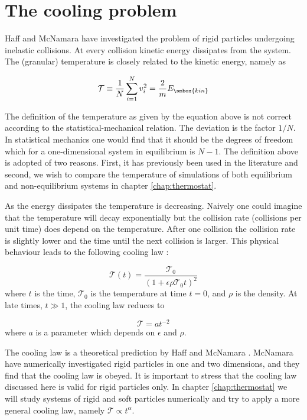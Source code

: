 \section{The cooling problem}
\label{sect:CoolProblem}
Haff \cite{Haff83} and McNamara \etal \cite{McNamara93a} have
investigated the problem of rigid particles undergoing inelastic
collisions. At every collision kinetic energy dissipates from the
system. The (granular) temperature is closely related to the kinetic
energy, namely as

\begin{equation}
  \mathcal{T} \equiv \frac{1}{N} \sum_{i=1}^N v_i^2 = \frac{2}{m} E_{\smbox{kin}}
\end{equation}

The definition of the temperature as given by the equation above is
not correct according to the statistical-mechanical relation. The
deviation is the factor $1/N$. In statistical mechanics one would find
that it should be the degrees of freedom which for a one-dimensional
system in equilibrium is $N-1$. The definition above is adopted of two
reasons. First, it has previously been used in the literature and
second, we wish to compare the temperature of simulations of both
equilibrium and non-equilibrium systems in chapter
\ref{chap:thermostat}.

As the energy dissipates the temperature is decreasing. Naively
one could imagine that the temperature will decay exponentially but
the collision rate (collisions per unit time) does depend on the
temperature. After one collision the collision rate is slightly lower
and the time until the next collision is larger. This physical
behaviour leads to the following cooling law \cite{McNamara93a}:

\begin{equation}
  \mathcal{T}(t) = \frac{\mathcal{T}_0}{(1+\epsilon\rho \mathcal{T}_0 t)^2}
\end{equation}
where $t$ is the time, $\mathcal{T}_0$ is the temperature at time $t=0$, and
$\rho$ is the density. At late times, $t\gg 1$, the cooling law
reduces to

\begin{equation}
  \mathcal{T} = a t^{-2}
\end{equation}
where $a$ is a parameter which depends on $\epsilon$ and $\rho$.

The cooling law is a theoretical prediction by Haff \cite{Haff83} and
McNamara \etal \cite{McNamara93a}. McNamara \etal \cite{McNamara93a,
McNamara94a} have numerically investigated rigid particles in
one and two dimensions, and they find that the cooling law is
obeyed. It is important to stress that the cooling law discussed here
is valid for rigid particles only. In chapter \ref{chap:thermostat} we
will study systems of rigid and soft particles numerically and try to
apply a more general cooling law, namely $\mathcal{T} \propto t^{\alpha}$.


